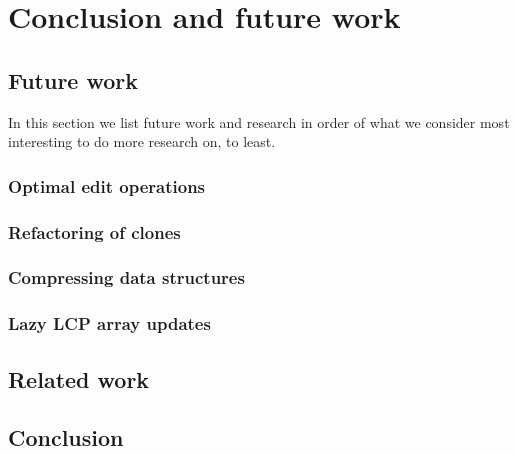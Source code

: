 \chapter{Conclusion and future work}

\section{Future work}

In this section we list future work and research in order of what we consider
most interesting to do more research on, to least.


\subsection*{Optimal edit operations}

\subsection*{Refactoring of clones}

\subsection*{Compressing data structures}

\subsection*{Lazy LCP array updates}

\section{Related work}


\section{Conclusion}
